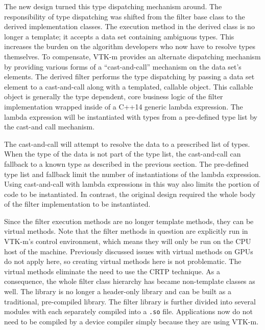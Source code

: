 The new design turned this type dispatching mechanism around.
The responsibility of type dispatching was shifted from the filter base class to the derived implementation classes.
The execution method in the derived class is no longer a template; it accepts a data set containing ambiguous types.
This increases the burden on the algorithm developers who now have to resolve types themselves.
To compensate, VTK-m provides an alternate dispatching mechanism by providing various forms of a ``cast-and-call'' mechanism on the data set's elements.
The derived filter performs the type dispatching by passing a data set element to a cast-and-call along with a templated, callable object.
This callable object is generally the type dependent, core business logic of the filter implementation wrapped inside of a C++14 generic lambda expression.
The lambda expression will be instantiated with types from a pre-defined type list by the cast-and call mechanism.

The cast-and-call will attempt to resolve the data to a prescribed list of types.
When the type of the data is not part of the type list, the cast-and-call can fallback to a known type as described in the previous  section.
The pre-defined type list and fallback limit the number of instantiations of the lambda expression.
Using cast-and-call with lambda expressions in this way also limits the portion of code to be instantiated.
In contrast, the original design required the whole body of the filter implementation to be instantiated.

Since the filter execution methods are no longer template methods, they can be virtual methods.
Note that the filter methods in question are explicitly run in VTK-m's control environment, which means they will only be run on the CPU host of the machine.
Previously discussed issues with virtual methods on GPUs do not apply here, so creating virtual methods here is not problematic.
The virtual methods eliminate the need to use the CRTP technique.
As a consequence, the whole filter class hierarchy has became  non-template classes as well.
The library is no longer a header-only library and can be built as a traditional, pre-compiled library.
The filter library is further divided into several modules with each separately compiled into a \texttt{.so} file.
Applications now do not need to be compiled by a device compiler simply because they are using VTK-m.

